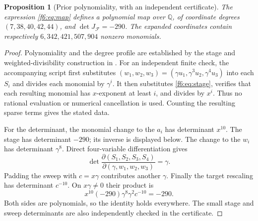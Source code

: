 \documentclass[11pt,a4paper]{article}
\newtheorem{proposition}[theorem]{Proposition}
\theoremstyle{definition}
\newcommand{\Q}{\mathbb Q}
\newcommand{\F}{\mathcal F}
\begin{document}
\begin{proposition}[Prior polynomiality, with an independent certificate]
\label{f6:prop:keller}
The expression \eqref{f6:eq:map} defines a polynomial map over $\Q$, of
coordinate degrees $(7,38,40,42,44)$, and
$\det J_{\F}=-290$. The expanded coordinates contain respectively
$6,342,421,507,904$ nonzero monomials.
\end{proposition}
\begin{proof}
Polynomiality and the degree profile are established by the stage and
weighted-divisibility construction in \cite[Theorem 4.5]{Gao}.
For an independent finite check, the accompanying script first substitutes
$(w_1,w_2,w_3)=(\gamma u_1,\gamma^3u_2,\gamma^4u_3)$ into each $S_i$
and divides each monomial by $\gamma^i$. It then substitutes
\eqref{f6:eq:stage}, verifies that each resulting monomial has $x$-exponent
at least $i$, and divides by $x^i$. Thus no rational evaluation or
numerical cancellation is used. Counting the resulting sparse terms gives
the stated data.

For the determinant, the monomial change to the $a_i$ has determinant
$x^{10}$. The stage has determinant $-290$; its inverse is displayed
below. The change to the $w_i$ has determinant $\gamma^8$. Direct
four-variable differentiation gives
\[
 \det\frac{\partial(S_1,S_2,S_3,S_4)}
               {\partial(\gamma,w_1,w_2,w_3)}=\gamma.
\]
Padding the sweep with $c=x\gamma$ contributes another $\gamma$.
Finally the target rescaling has determinant $c^{-10}$. On
$x\gamma\ne0$ their product is
\[
 x^{10}(-290)\gamma^8\gamma^2c^{-10}=-290.
\]
Both sides are polynomials, so the identity holds everywhere. The small
stage and sweep determinants are also independently checked in the
certificate.
\end{proof}
\end{document}
